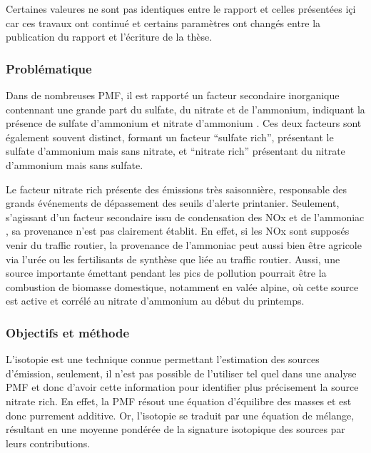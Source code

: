\begin{tcolorbox}[colback=red!5!white,colframe=ProcessBlue,title=Note]
    Certaines valeures ne sont pas identiques entre le rapport et celles présentées içi
    car ces travaux ont continué et certains paramètres ont changés entre la publication
    du rapport et l'écriture de la thèse.
\end{tcolorbox}


\subsubsection{Problématique}%
\label{ssub:problématique}

Dans de nombreuses PMF, il est rapporté un facteur secondaire inorganique contennant une
grande part du sulfate, du nitrate et de l'ammonium, indiquant la présence de sulfate
d'ammonium  et nitrate d'ammonium . Ces deux facteurs sont
également souvent distinct, formant un facteur ``sulfate rich'', présentant le sulfate
d'ammonium mais sans nitrate, et ``nitrate rich'' présentant du nitrate d'ammonium mais
sans sulfate.

Le facteur nitrate rich présente des émissions très saisonnière, responsable des grands
événements de dépassement des seuils d'alerte printanier. Seulement, s'agissant d'un
facteur secondaire issu de condensation des NOx et de l'ammoniac , sa provenance
n'est pas clairement établit. En effet, si les NOx sont supposés venir du traffic routier,
la provenance de l'ammoniac peut aussi bien être agricole via l'urée ou les fertilisants de
synthèse que liée au traffic routier. Aussi, une source importante émettant pendant les
pics de pollution pourrait être la combustion de biomasse domestique, notamment en valée
alpine, où cette source est active et corrélé au nitrate d'ammonium au début du printemps.

\subsubsection{Objectifs et méthode}%
\label{ssub:objectif_et_methode}

L'isotopie est une technique connue permettant l'estimation des sources d'émission,
seulement, il n'est pas possible de l'utiliser tel quel dans une analyse PMF et donc
d'avoir cette information pour identifier plus précisement la source nitrate rich.
En effet, la PMF résout une équation d'équilibre des masses et est donc purrement
additive. Or, l'isotopie se traduit par une équation de mélange, résultant en une moyenne
pondérée de la signature isotopique des sources par leurs contributions.

